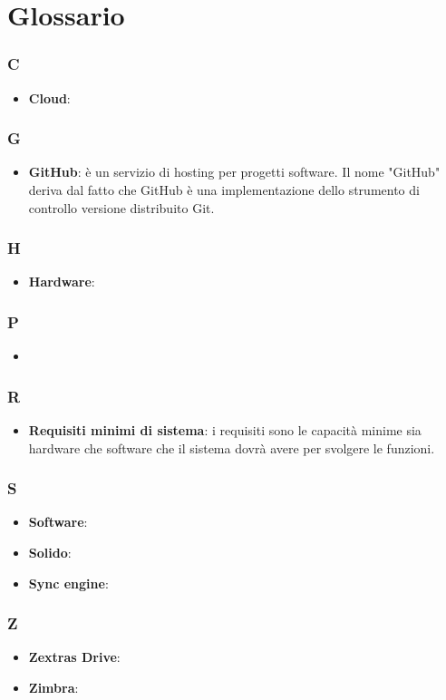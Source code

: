 \appendix

\section{Glossario}

\subsubsection{C}
\begin{itemize}
	\item \textbf{Cloud}:
\end{itemize}
\subsubsection{G}
\begin{itemize}
	\item \textbf{GitHub}: è un servizio di hosting per progetti software. Il nome "GitHub" deriva dal fatto che
GitHub è una implementazione dello strumento di controllo versione distribuito Git.
\end{itemize}
\subsubsection{H}
\begin{itemize}
	\item \textbf{Hardware}:
\end{itemize}

\subsubsection{P}
\begin{itemize}
	\item 
\end{itemize}

\subsubsection{R}
\begin{itemize}
	\item \textbf{Requisiti minimi di sistema}: i requisiti sono le capacità minime sia hardware che software che il sistema dovrà avere per svolgere le funzioni.
\end{itemize}

\subsubsection{S}
\begin{itemize}
	\item \textbf{Software}: 
	\item \textbf{Solido}:
	\item \textbf{Sync engine}:
\end{itemize}

\subsubsection{Z}
\begin{itemize}
	\item \textbf{Zextras Drive}:
	\item \textbf{Zimbra}:
\end{itemize}